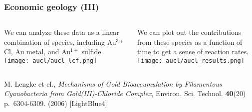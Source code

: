 \begin{frame}
  \frametitle{Economic geology (III)}

  \begin{columns}
    \begin{column}{0.5\linewidth}
      We can analyze these data as a linear combination of species,
      including {\color{Green4}Au$^{3+}$Cl}, {\color{Purple4}Au
        metal}, and {\color{Orange2}Au$^{1+}$ sulfide}.\\[1ex]
      \texttt{[image: aucl/aucl\_lcf.png]}
    \end{column}
    \begin{column}{0.5\linewidth}
      We can plot out the contributions from these species as a
      function of time to get a sense of reaction rates.\\[1ex]
      \texttt{[image: aucl/aucl\_results.png]}
    \end{column}
  \end{columns}

  \begin{bottomnote}[0.52][19]
    M. Lengke et el., \textit{Mechanisms of Gold Bioaccumulation by
      Filamentous Cyanobacteria from Gold(III)-Chloride Complex},
    Environ. Sci. Technol. \textbf{40}(20) p.~6304-6309. (2006)
    [LightBlue4]
  \end{bottomnote}
\end{frame}
